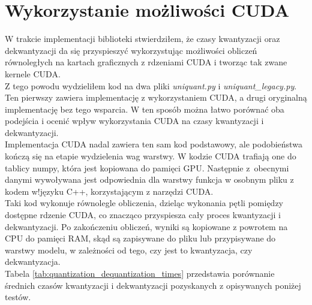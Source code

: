 \section{Wykorzystanie możliwości CUDA}
W trakcie implementacji biblioteki stwierdziłem, że czasy kwantyzacji oraz dekwantyzacji da się przyspieszyć wykorzystując możliwości obliczeń równoległych na kartach graficznych z rdzeniami CUDA i tworząc tak zwane kernele CUDA. \\
Z tego powodu wydzieliłem kod na dwa pliki \textit{uniquant.py} i \textit{uniquant\_legacy.py}. Ten pierwszy zawiera implementację z wykorzystaniem CUDA, a drugi oryginalną implementację bez tego wsparcia. W ten sposób można łatwo porównać oba podejścia i ocenić wpływ wykorzystania CUDA na czasy kwantyzacji i dekwantyzacji. \\
Implementacja CUDA nadal zawiera ten sam kod podstawowy, ale podobieństwa kończą się na etapie wydzielenia wag warstwy. W kodzie CUDA trafiają one do tablicy numpy, która jest kopiowana do pamięci GPU. Następnie z~obecnymi danymi wywoływana jest odpowiednia dla warstwy funkcja w osobnym pliku z kodem w!języku C++, korzystającym z narzędzi CUDA. \\
Taki kod wykonuje równolegle obliczenia, dzieląc wykonania pętli pomiędzy dostępne rdzenie CUDA, co znacząco przyspiesza cały proces kwantyzacji i dekwantyzacji. Po zakończeniu obliczeń, wyniki są kopiowane z powrotem na CPU do pamięci RAM, skąd są zapisywane do pliku lub przypisywane do warstwy modelu, w zależności od tego, czy jest to kwantyzacja, czy dekwantyzacja. \\
Tabela \ref{tab:quantization_dequantization_times} przedstawia porównanie średnich czasów kwantyzacji i dekwantyzacji pozyskanych z opisywanych poniżej testów.

